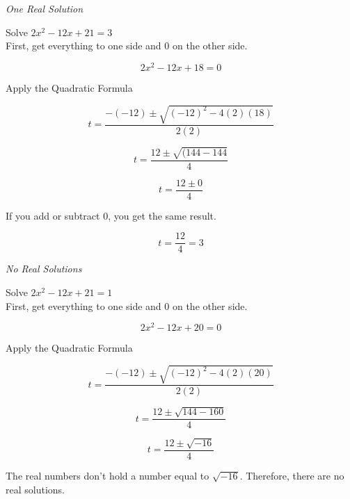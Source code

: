 \documentclass{ximera}
\begin{document}
\begin{example} \textit{One Real Solution}

Solve $2 x^2 - 12x + 21 = 3$ \\


First, get everything to one side and $0$ on the other side.



\[  2 x^2 - 12x + 18 = 0  \]

Apply the Quadratic Formula


\[   t = \frac{-(-12) \pm \sqrt{(-12)^2 - 4 (2) (18)}}{2 (2)}            \]



\[   t = \frac{12 \pm \sqrt{(144 - 144}}{4}            \]

\[   t = \frac{12 \pm 0}{4}            \]

If you add or subtract $0$, you get the same result.

\[   t = \frac{12}{4}   = 3         \]







\end{example}








\begin{example} \textit{No Real Solutions}

Solve $2 x^2 - 12x + 21 = 1$ \\


First, get everything to one side and $0$ on the other side.



\[  2 x^2 - 12x + 20 = 0  \]

Apply the Quadratic Formula


\[   t = \frac{-(-12) \pm \sqrt{(-12)^2 - 4 (2) (20)}}{2 (2)}            \]

\[   t = \frac{12 \pm \sqrt{144 - 160}}{4}            \]

\[   t = \frac{12 \pm \sqrt{-16}}{4}            \]



The real numbers don't hold a number equal to $\sqrt{-16}$.  Therefore, there are no real solutions.





\end{example}
\end{document}
